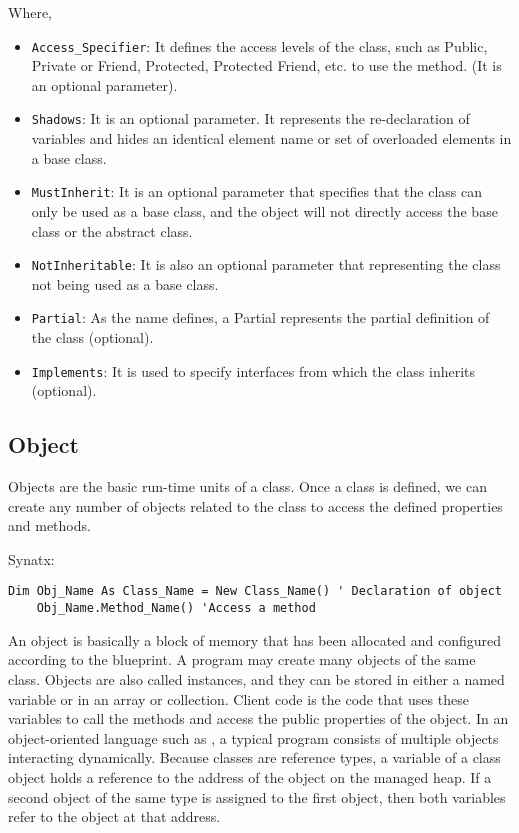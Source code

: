 Where,
\begin{itemize}
	\item 
	\texttt{Access\_Specifier}: It defines the access levels of the class, such as Public, Private or Friend, Protected, Protected Friend, etc. to use the method. (It is an optional parameter).
	\item \texttt{Shadows}: It is an optional parameter. It represents the re-declaration of variables and hides an identical element name or set of overloaded elements in a base class.
	\item \texttt{MustInherit}: It is an optional parameter that specifies that the class can only be used as a base class, and the object will not directly access the base class or the abstract class.
	\item \texttt{NotInheritable}: It is also an optional parameter that representing the class not being used as a base class.
	\item \texttt{Partial}: As the name defines, a Partial represents the partial definition of the class (optional).
	
	\item \texttt{Implements}: It is used to specify interfaces from which the class inherits (optional).
\end{itemize}

\subsection{Object}
Objects are the basic run-time units of a class. Once a class is defined, we can create any number of objects related to the class to access the defined properties and methods. 

Synatx:

\begin{lstlisting}[style=vb]
	Dim Obj_Name As Class_Name = New Class_Name() ' Declaration of object
	Obj_Name.Method_Name() 'Access a method
\end{lstlisting}

An object is basically a block of memory that has been allocated and configured according to the blueprint. A program may create many objects of the same class. Objects are also called instances, and they can be stored in either a named variable or in an array or collection. Client code is the code that uses these variables to call the methods and access the public properties of the object. In an object-oriented language such as {\cs}, a typical program consists of multiple objects interacting dynamically. Because classes are reference types, a variable of a class object holds a reference to the address of the object on the managed heap. If a second object of the same type is assigned to the first object, then both variables refer to the object at that address.

